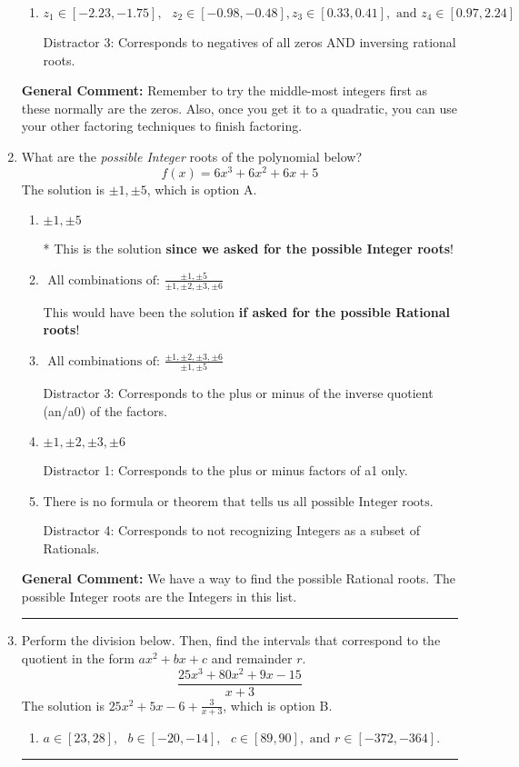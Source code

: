 \documentclass{extbook}[14pt]
\newcommand{\litem}[1]{\item #1

\rule{\textwidth}{0.4pt}}
\begin{document}
\begin{enumerate}
{\begin{enumerate}[label=\Alph*.]
 Distractor 2: Corresponds to inversing rational roots.
\item \( z_1 \in [-2.23, -1.75], \text{   }  z_2 \in [-0.98, -0.48], z_3 \in [0.33, 0.41], \text{   and   } z_4 \in [0.97, 2.24] \)

 Distractor 3: Corresponds to negatives of all zeros AND inversing rational roots.
\end{enumerate}

\textbf{General Comment:} Remember to try the middle-most integers first as these normally are the zeros. Also, once you get it to a quadratic, you can use your other factoring techniques to finish factoring.
}
\litem{
What are the \textit{possible Integer} roots of the polynomial below?
\[ f(x) = 6x^{3} +6 x^{2} +6 x + 5 \]The solution is \( \pm 1,\pm 5 \), which is option A.\begin{enumerate}[label=\Alph*.]
\item \( \pm 1,\pm 5 \)

* This is the solution \textbf{since we asked for the possible Integer roots}!
\item \( \text{ All combinations of: }\frac{\pm 1,\pm 5}{\pm 1,\pm 2,\pm 3,\pm 6} \)

This would have been the solution \textbf{if asked for the possible Rational roots}!
\item \( \text{ All combinations of: }\frac{\pm 1,\pm 2,\pm 3,\pm 6}{\pm 1,\pm 5} \)

 Distractor 3: Corresponds to the plus or minus of the inverse quotient (an/a0) of the factors. 
\item \( \pm 1,\pm 2,\pm 3,\pm 6 \)

 Distractor 1: Corresponds to the plus or minus factors of a1 only.
\item \( \text{There is no formula or theorem that tells us all possible Integer roots.} \)

 Distractor 4: Corresponds to not recognizing Integers as a subset of Rationals.
\end{enumerate}

\textbf{General Comment:} We have a way to find the possible Rational roots. The possible Integer roots are the Integers in this list.
}
\litem{
Perform the division below. Then, find the intervals that correspond to the quotient in the form $ax^2+bx+c$ and remainder $r$.
\[ \frac{25x^{3} +80 x^{2} +9 x -15}{x + 3} \]The solution is \( 25x^{2} +5 x -6 + \frac{3}{x + 3} \), which is option B.\begin{enumerate}[label=\Alph*.]
\item \( a \in [23, 28], \text{   } b \in [-20, -14], \text{   } c \in [89, 90], \text{   and   } r \in [-372, -364]. \)


\end{enumerate}}
\end{enumerate}
\end{document}
